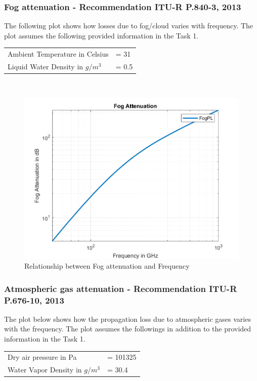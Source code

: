 \documentclass[a4paper,11pt]{article}%
\begin{document}
\subsubsection{Fog attenuation - Recommendation ITU-R P.840-3, 2013\cite{fog}}
The following plot shows how losses due to fog/cloud varies with frequency. The plot assumes the following provided information in the Task 1.\\

\begin{tabular}{l l}
	Ambient Temperature in Celsius&= 31\\
	Liquid Water Density in $g/m^3$&= 0.5\\
\end{tabular}\\

\begin{figure}[!h]
	\centering
	\includegraphics[scale=0.75]{code/FogPL.png}
	\caption{Relationship between Fog attenuation  and Frequency}
\end{figure}

\subsubsection{Atmospheric gas attenuation - Recommendation ITU-R P.676-10, 2013\cite{gas}}

The plot below shows how the propagation loss due to atmospheric gases varies with the frequency. The plot assumes the followings in addition to the provided information in the Task 1.

\begin{tabular}{l l}
	 Dry air pressure in Pa&= 101325\\
	 Water Vapor Density in $g/m^3$&= 30.4\\
\end{tabular}
\end{document}
